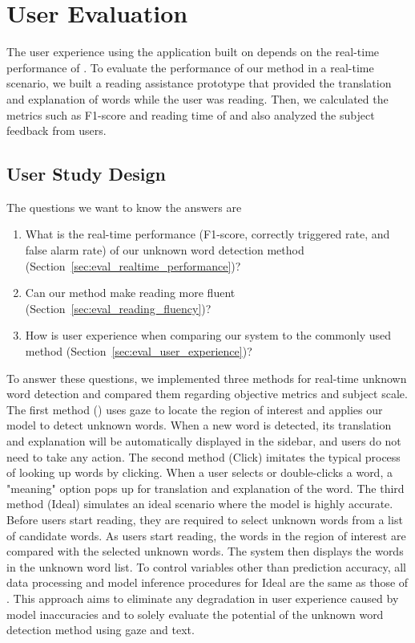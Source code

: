 \section{User Evaluation}
\label{sec:user_evaluation}
The user experience using the application built on \name{} depends on the real-time performance of \name{}. To evaluate the performance of our method in a real-time scenario, we built a reading assistance prototype that provided the translation and explanation of words while the user was reading. Then, we calculated the metrics such as F1-score and reading time of \name{} and also analyzed the subject feedback from users.

\subsection{User Study Design}
\label{sec:user_study_design}
The questions we want to know the answers are
\begin{enumerate}
    \item What is the real-time performance (F1-score, correctly triggered rate, and false alarm rate) of our unknown word detection method (Section~\ref{sec:eval_realtime_performance})?
    \item Can our method make reading more fluent (Section~\ref{sec:eval_reading_fluency})?
    \item How is user experience when comparing our system to the commonly used method (Section~\ref{sec:eval_user_experience})?
\end{enumerate}

To answer these questions, we implemented three methods for real-time unknown word detection and compared them regarding objective metrics and subject scale. The first method (\name{}) uses gaze to locate the region of interest and applies our model to detect unknown words. When a new word is detected, its translation and explanation will be automatically displayed in the sidebar, and users do not need to take any action. The second method (Click) imitates the typical process of looking up words by clicking. When a user selects or double-clicks a word, a "meaning" option pops up for translation and explanation of the word.  The third method (Ideal) simulates an ideal scenario where the model is highly accurate. Before users start reading, they are required to select unknown words from a list of candidate words. As users start reading, the words in the region of interest are compared with the selected unknown words. The system then displays the words in the unknown word list. To control variables other than prediction accuracy, all data processing and model inference procedures for Ideal are the same as those of \name{}. This approach aims to eliminate any degradation in user experience caused by model inaccuracies and to solely evaluate the potential of the unknown word detection method using gaze and text.


